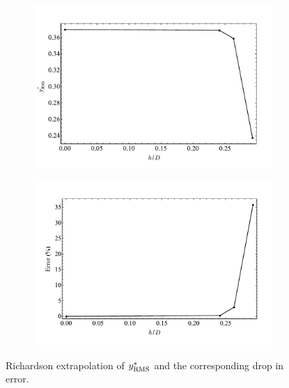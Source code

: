 \documentclass[oneside]{utmthesis}
\begin{document}
\begin{figure}
  \centering
  \begin{subfigure}[h]{1\textwidth}
    \includegraphics[width=\textwidth]{figs/gciYrms-1}
    \caption{}
    \label{fig:gciYrms-1}
  \end{subfigure}

  \begin{subfigure}[h]{1\textwidth}
    \includegraphics[width=\textwidth]{figs/gciYrms-2}
    \caption{}
    \label{fig:gciYrms-2}
  \end{subfigure}

  \caption{Richardson extrapolation of $y^{*}_{\text{RMS}}$ and the corresponding drop in error.} \label{fig:gciYrms}
\end{figure}
\end{document}
